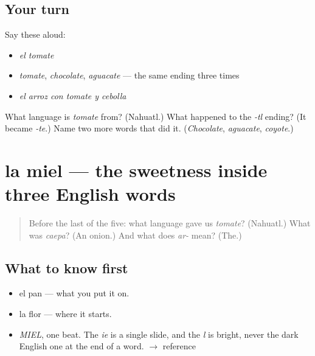 \subsection*{Your turn}
Say these aloud:

\begin{itemize}
\raggedright
  \item \emph{el tomate}
  \item \emph{tomate}, \emph{chocolate}, \emph{aguacate} — the same ending three times
  \item \emph{el arroz con tomate y cebolla}
\end{itemize}

\begin{tcolorbox}[breakable,colback=teal!4,colframe=teal!35!black,title={Before you move on}]
What language is \emph{tomate} from? (Nahuatl.) What happened to the \emph{-tl} ending? (It became \emph{-te}.) Name two more words that did it. (\emph{Chocolate}, \emph{aguacate}, \emph{coyote}.)
\end{tcolorbox}
\section[la miel]{la miel — the sweetness inside three English words}

\label{lesson:ES-C290-miel}



\begin{quote}
Before the last of the five: what language gave us \emph{tomate}? (Nahuatl.) What was \emph{caepa}? (An onion.) And what does \emph{ar-} mean? (The.)
\end{quote}

\subsection*{What to know first}
\begin{itemize}
\raggedright
  \item el pan — what you put it on.
  \item la flor — where it starts.
\end{itemize}

\begin{sounds}
\begin{itemize}
\raggedright
  \item \emph{MIEL}, one beat. The \emph{ie} is a single slide, and the \emph{l} is bright, never the dark English one at the end of a word. $\to$ reference
\end{itemize}
\end{sounds}

